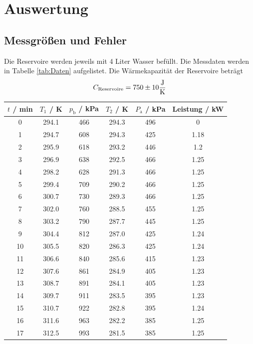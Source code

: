 \section{Auswertung}
\label{sec:Auswertung}
\subsection{Messgrößen und Fehler}
Die Reservoire werden jeweils mit 4 Liter Wasser befüllt. Die Messdaten werden in Tabelle \ref{tab:Daten} aufgelistet. Die Wärmekapazität der Reservoire beträgt
\begin{equation}
  C_{\text{Reservoire}} = \num{750 +- 10} \frac{\text{J}}{\text{K}}
  \label{eqn:c_re}
\end{equation}

\begin{table}
  \centering
  \begin{tabular}{c c c c c c}
    \toprule
    $t$ / min & $T_\text{1}$ / K & $p_\text{b}$ / kPa & $T_\text{2}$ / K & $P_\text{a}$ / kPa & Leistung / kW \\
    \midrule
    0 	& 294.1 & 466	& 294.3	& 496	& 0	    \\
    1 	& 294.7 & 608	& 294.3	& 425	& 1.18	\\
    2 	& 295.9 & 618	& 293.2	& 446	& 1.2	  \\
    3 	& 296.9 & 638	& 292.5	& 466	& 1.25	\\
    4	& 298.2	& 628	& 291.3	& 466	& 1.25	\\
    5	& 299.4 & 709	& 290.2	& 466	& 1.25	\\
    6	& 300.7 & 730	& 289.3	& 466	& 1.25	\\
    7	& 302.0 & 760	& 288.5	& 455	& 1.25	\\
    8	& 303.2	& 790	& 287.7	& 445	& 1.25	\\
    9	& 304.4 & 812	& 287.0	& 425	& 1.24	\\
    10	& 305.5 & 820	& 286.3	& 425	& 1.24	\\
    11 	& 306.6 & 840	& 285.6	& 415	& 1.23	\\
    12	& 307.6	& 861	& 284.9	& 405	& 1.23	\\
    13	& 308.7 & 891	& 284.1	& 405	& 1.23	\\
    14 	& 309.7 & 911	& 283.5	& 395	& 1.23	\\
    15 	& 310.7 & 922	& 282.8	& 395	& 1.24	\\
    16 	& 311.6	& 963	& 282.2	& 385	& 1.25	\\
    17	& 312.5	& 993	& 281.5	& 385	& 1.25	\\

\end{tabular}
\end{table}
